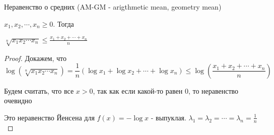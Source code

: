 \begin{theorem}
    Неравенство о средних (AM-GM - arigthmetic mean, geometry mean)

    $x_1, x_2, \cdots, x_n \geq 0$. Тогда

    $\sqrt[n]{x_1x_2\cdots x_n} \leq \frac{x_1+x_2+\cdots+x_n}{n}$
\end{theorem}

\begin{proof}
    Докажем, что \[\log (\sqrt[n]{x_1x_2\cdots x_n}) = \frac{1}{n}(\log x_1 + \log x_2 + \cdots + \log x_n) 
    \leq \log (\frac{x_1+x_2+\cdots+x_n}{n})\]

    Будем считать, что все $x > 0$, так как если какой-то равен 0, то неравенство очевидно

    
    Это неравенство Йенсена для $f(x) = -\log x$ - выпуклая.
    $\lambda_1 = \lambda_2 = \cdots = \lambda_n = \frac{1}{n} $
\end{proof}